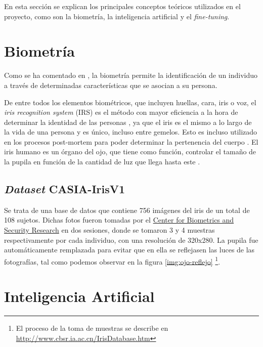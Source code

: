  \label{capitulo3}

En esta sección se explican los principales conceptos teóricos utilizados en el proyecto, como son la biometría, la inteligencia
 artificial y el \textit{fine-tuning}.


\section{Biometría}

Como se ha comentado en , la biometría permite la identificación de un individuo a través de determinadas características que 
se asocian a su persona. 

De entre todos los elementos biométricos, que incluyen huellas, cara, iris o voz, el \textit{iris recognition system} (IRS) es el método con mayor eficiencia a la hora de determinar la identidad
de las personas \cite{malgheet_iris_2021}, ya que el iris es el mismo a lo largo de la vida de una persona y es único, incluso entre gemelos. Esto es incluso utilizado en los procesos 
post-mortem para poder determinar la pertenencia del cuerpo \cite{boyd_post-mortem_2020}. El iris humano es un órgano del ojo, que tiene como función, controlar el tamaño
de la pupila en función de la cantidad de luz que llega hasta este \cite{boyd_post-mortem_2020}.

\subsection{\textit{Dataset} CASIA-IrisV1 }	\label{casia}

Se trata de una base de datos que contiene 756 imágenes del iris de un total de 108 sujetos. 
Dichas fotos fueron tomadas por el \href{http://www.cbsr.ia.ac.cn/english/index.asp}{Center for Biometrics and Security Research} en dos sesiones, donde se tomaron 3 y 4 muestras respectivamente por cada individuo, con una resolución de 320x280. 
La pupila fue automáticamente remplazada para evitar que en ella se reflejasen las luces de las fotografías, tal como podemos observar en la figura \ref{img:ojo-reflejo} 
\footnote{El proceso de la toma de muestras se describe en \url{http://www.cbsr.ia.ac.cn/IrisDatabase.htm}}.

\section{Inteligencia Artificial}

